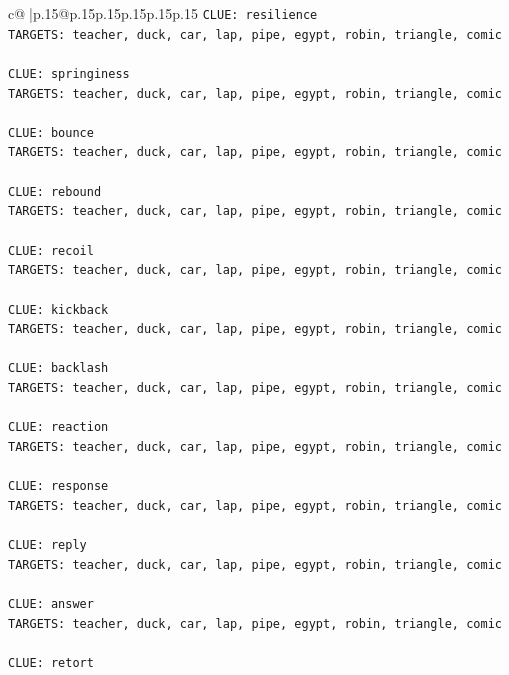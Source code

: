 \documentclass{article}
\begin{document}
{\begin{supertabular}{c@{$\;$}|p{.15\linewidth}@{}p{.15\linewidth}p{.15\linewidth}p{.15\linewidth}p{.15\linewidth}p{.15\linewidth}}
{{{\texttt{CLUE: resilience} \\
\texttt{TARGETS: teacher, duck, car, lap, pipe, egypt, robin, triangle, comic} \\
\\ 
\texttt{CLUE: springiness} \\
\texttt{TARGETS: teacher, duck, car, lap, pipe, egypt, robin, triangle, comic} \\
\\ 
\texttt{CLUE: bounce} \\
\texttt{TARGETS: teacher, duck, car, lap, pipe, egypt, robin, triangle, comic} \\
\\ 
\texttt{CLUE: rebound} \\
\texttt{TARGETS: teacher, duck, car, lap, pipe, egypt, robin, triangle, comic} \\
\\ 
\texttt{CLUE: recoil} \\
\texttt{TARGETS: teacher, duck, car, lap, pipe, egypt, robin, triangle, comic} \\
\\ 
\texttt{CLUE: kickback} \\
\texttt{TARGETS: teacher, duck, car, lap, pipe, egypt, robin, triangle, comic} \\
\\ 
\texttt{CLUE: backlash} \\
\texttt{TARGETS: teacher, duck, car, lap, pipe, egypt, robin, triangle, comic} \\
\\ 
\texttt{CLUE: reaction} \\
\texttt{TARGETS: teacher, duck, car, lap, pipe, egypt, robin, triangle, comic} \\
\\ 
\texttt{CLUE: response} \\
\texttt{TARGETS: teacher, duck, car, lap, pipe, egypt, robin, triangle, comic} \\
\\ 
\texttt{CLUE: reply} \\
\texttt{TARGETS: teacher, duck, car, lap, pipe, egypt, robin, triangle, comic} \\
\\ 
\texttt{CLUE: answer} \\
\texttt{TARGETS: teacher, duck, car, lap, pipe, egypt, robin, triangle, comic} \\
\\ 
\texttt{CLUE: retort} \\
}}}
\end{supertabular}}
\end{document}
